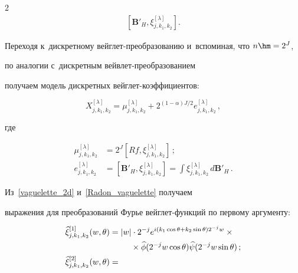 \begin{multicols}{2}
\begin{align*}
\left[ \mathbf{B'}_H, \xi_{j,k_1,k_2}^{[\lambda]}\right]\!.


\end{align*}


%





Переходя к~дискретному вейглет-пре\-обра\-зо\-ва\-нию и~вспоминая, что $n\hm=2^J$,


по аналогии с~дискретным вейв\-лет-пре\-обра\-зо\-ва\-ни\-ем


получаем модель дискретных вейг\-лет-ко\-эф\-фи\-ци\-ентов:


\begin{equation*}


X_{j,k_1,k_2}^{[\lambda]} = \mu_{j,k_1,k_2}^{[\lambda]} +


2^{(1-\alpha)J/2} e_{j,k_1,k_2}^{[\lambda]}\,,


\end{equation*}


где


\begin{align*}


\mu_{j,k_1,k_2}^{[\lambda]} &=  2^J\left[Rf, \xi_{j,k_1,k_2}^{[\lambda]}\right]\,;


\\


e_{j,k_1,k_2}^{[\lambda]}&=\left[ \mathbf{B'}_H, \xi_{j,k_1,k_2}^{[\lambda]}\right]


=\int\xi_{j,k_1,k_2}^{[\lambda]}\,d\mathbf{B'}_H\,.


\end{align*}





Из~\eqref{vaguelette_2d} и~\eqref{Radon_vaguelette} получаем


выражения для преобразований Фурье вейг\-лет-функ\-ций по первому аргументу:


\begin{align*}


\widehat{\xi}_{j,k_1,k_2}^{[1]}(w,\theta) &= |w|\cdot 2^{-j}e^{i(k_1\cos\theta+k_2


\sin\theta) 2^{-j} w}\times{}\\


&\hspace*{9mm}{}\times \widehat{\phi}(2^{-j}w\cos\theta) \widehat{\psi}(2^{-j}w\sin\theta)\,;\\


\widehat{\xi}_{j,k_1,k_2}^{[2]}(w,\theta) &=



\end{align*}
\end{multicols}
